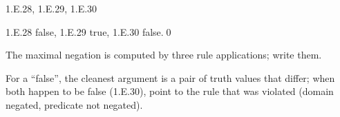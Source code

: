 \begin{bookex}[recommended]{1.E.28, 1.E.29, 1.E.30}
\begin{steps}
\end{steps}
\conclusion 1.E.28 false, 1.E.29 true, 1.E.30 false.\qed
\begin{compare}
\item The maximal negation is computed by three rule applications; write them.
\item For a ``false'', the cleanest argument is a pair of truth values that differ; when both happen to be false (1.E.30), point to the rule that was violated (domain negated, predicate not negated).
\end{compare}
\end{bookex}
